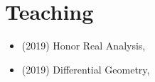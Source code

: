 %

\section{Teaching}

\begin{itemize}
    \item (2019) Honor Real Analysis, \HKUST
    \item (2019) Differential Geometry, \HKUST
\end{itemize}


